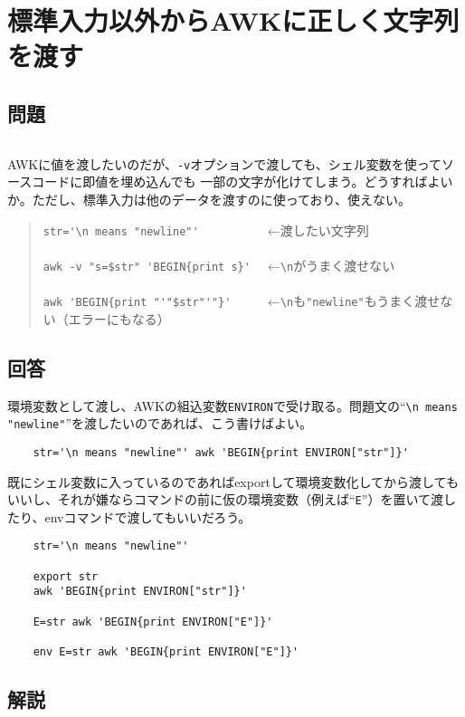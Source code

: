 \section{標準入力以外からAWKに正しく文字列を渡す}

\subsection*{問題}
\noindent
$\!\!\!\!\!$
\begin{grshfboxit}{160.0mm}
	AWKに値を渡したいのだが、\verb|-v|オプションで渡しても、シェル変数を使ってソースコードに即値を埋め込んでも
	一部の文字が化けてしまう。どうすればよいか。ただし、標準入力は他のデータを渡すのに使っており、使えない。
	\begin{quote}
		\verb|str='\n means "newline"'          | ←渡したい文字列 \\
		\verb|| \\
		\verb|awk -v "s=$str" 'BEGIN{print s}'  | ←\verb|\n|がうまく渡せない \\
		\verb|| \\
		\verb|awk 'BEGIN{print "'"$str"'"}'     | ←\verb|\n|も\verb|"newline"|もうまく渡せない（エラーにもなる）
	\end{quote}
\end{grshfboxit}

\subsection*{回答}
環境変数として渡し、AWKの組込変数\verb|ENVIRON|で受け取る。問題文の``\verb|\n means "newline"|''を渡したいのであれば、こう書けばよい。\\
\begin{verbatim}
	str='\n means "newline"' awk 'BEGIN{print ENVIRON["str"]}'
\end{verbatim}
既にシェル変数に入っているのであればexportして環境変数化してから渡してもいいし、それが嫌ならコマンドの前に仮の環境変数（例えば``\verb|E|''）を置いて渡したり、envコマンドで渡してもいいだろう。\\
\begin{verbatim}
	str='\n means "newline"'

	export str
	awk 'BEGIN{print ENVIRON["str"]}'

	E=str awk 'BEGIN{print ENVIRON["E"]}'

	env E=str awk 'BEGIN{print ENVIRON["E"]}'
\end{verbatim}

\subsection*{解説}

